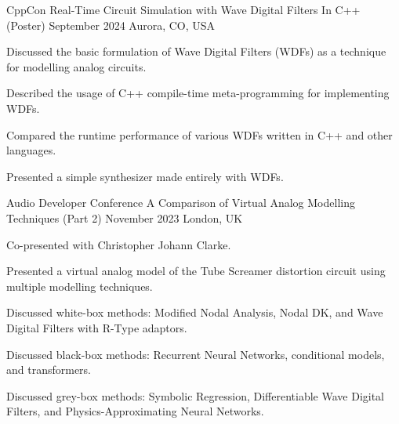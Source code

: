 

\begin{cventries}

  \cventry
    {CppCon} %
    {Real-Time Circuit Simulation with Wave Digital Filters In C++ (Poster)} %
    {September 2024} %
    {Aurora, CO, USA} %
    {
      \begin{cvitems} %
        \item {Discussed the basic formulation of Wave Digital Filters (WDFs) as a technique for modelling analog circuits.}
        \item {Described the usage of C++ compile-time meta-programming for implementing WDFs.}
        \item {Compared the runtime performance of various WDFs written in C++ and other languages.}
        \item {Presented a simple synthesizer made entirely with WDFs.}
      \end{cvitems}
    }

  \cventry
    {Audio Developer Conference} %
    {A Comparison of Virtual Analog Modelling Techniques (Part 2)} %
    {November 2023} %
    {London, UK} %
    {
      \begin{cvitems} %
        \item {Co-presented with Christopher Johann Clarke.}
        \item {Presented a virtual analog model of the Tube Screamer distortion circuit using multiple modelling techniques.}
        \item {Discussed white-box methods: Modified Nodal Analysis, Nodal DK, and Wave Digital Filters with R-Type adaptors.}
        \item {Discussed black-box methods: Recurrent Neural Networks, conditional models, and transformers.}
        \item {Discussed grey-box methods: Symbolic Regression, Differentiable Wave Digital Filters, and Physics-Approximating Neural Networks.}
      \end{cvitems}
    }


\end{cventries}
